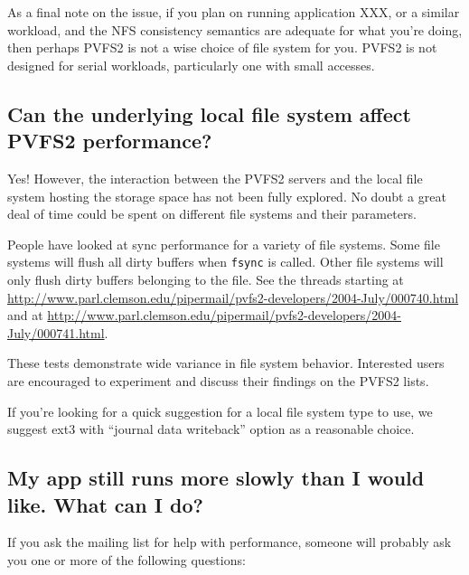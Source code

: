 \documentclass[11pt,letterpaper]{article}
\begin{document}
As a final note on the issue, if you plan on running application XXX,
or a similar workload, and the NFS consistency semantics are adequate
for what you're doing, then perhaps PVFS2 is not a wise choice of file
system for you.  PVFS2 is not designed for serial workloads,
particularly one with small accesses.

\subsection{Can the underlying local file system affect PVFS2 performance?}
\label{sec:local_fs}

Yes!  However, the interaction between the PVFS2 servers and the local
file system hosting the storage space has not been fully explored.  No
doubt a great deal of time could be spent on different file systems
and their parameters.

People have looked at sync performance for a variety of file systems.
Some file systems will flush all dirty buffers when \texttt{fsync} is
called.  Other file systems will only flush dirty buffers belonging to
the file. See the threads starting at
\url{http://www.parl.clemson.edu/pipermail/pvfs2-developers/2004-July/000740.html}
and at
\url{http://www.parl.clemson.edu/pipermail/pvfs2-developers/2004-July/000741.html}.

These tests demonstrate wide variance in file system behavior.
Interested users are encouraged to experiment and discuss their
findings on the PVFS2 lists.

If you're looking for a quick suggestion for a local file system type
to use, we suggest ext3 with ``journal data writeback'' option as a
reasonable choice.

\subsection{My app still runs more slowly than I would like.  What can I do?}
\label{sec:tuning}

If you ask the mailing list for help with performance, someone will probably
ask you one or more of the following questions:
\end{document}
